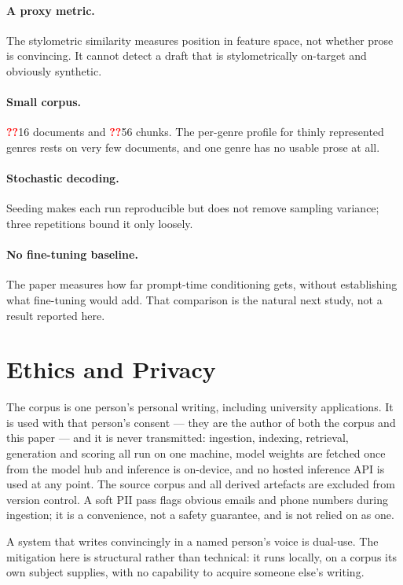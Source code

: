 \documentclass[11pt]{article}
\newcommand{\pending}[1][??]{\textcolor{red}{\textbf{#1}}}
\begin{document}
\paragraph{A proxy metric.} The stylometric similarity measures position in
feature space, not whether prose is convincing. It cannot detect a draft that is
stylometrically on-target and obviously synthetic.

\paragraph{Small corpus.} \pending{16} documents and \pending{56} chunks. The
per-genre profile for thinly represented genres rests on very few documents, and
one genre has no usable prose at all.

\paragraph{Stochastic decoding.} Seeding makes each run reproducible but does not
remove sampling variance; three repetitions bound it only loosely.

\paragraph{No fine-tuning baseline.} The paper measures how far prompt-time
conditioning gets, without establishing what fine-tuning would add. That
comparison is the natural next study, not a result reported here.

\section{Ethics and Privacy}
\label{sec:ethics}

The corpus is one person's personal writing, including university applications.
It is used with that person's consent --- they are the author of both the corpus
and this paper --- and it is never transmitted: ingestion, indexing, retrieval,
generation and scoring all run on one machine, model weights are fetched once
from the model hub and inference is on-device, and no hosted inference API is
used at any point. The source corpus and all derived artefacts are excluded from
version control. A soft PII pass flags obvious emails and phone numbers during
ingestion; it is a convenience, not a safety guarantee, and is not relied on as
one.

A system that writes convincingly in a named person's voice is dual-use. The
mitigation here is structural rather than technical: it runs locally, on a
corpus its own subject supplies, with no capability to acquire someone else's
writing.
\end{document}
